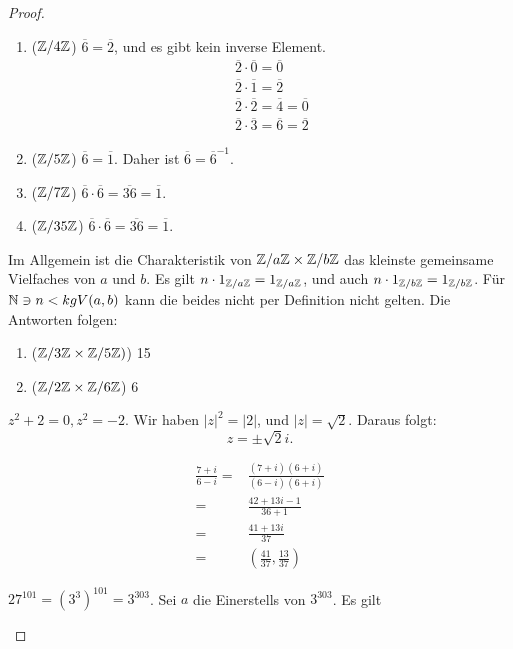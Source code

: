 \begin{proof}
	\begin{parts}
	\item 
		\begin{enumerate}[label=(\roman*)]
			\item ($\mathbb{Z} / 4\mathbb{Z}$) $\overline{6}=\overline{2}$, und es gibt kein inverse Element.
				\begin{gather*}
					\overline{2}\cdot \overline{0}=\overline{0}\\
					\overline{2}\cdot \overline{1}=\overline{2}\\
					\overline{2}\cdot \overline{2}=\overline{4}=\overline{0}\\
					\overline{2}\cdot \overline{3}=\overline{6}=\overline{2}
				\end{gather*}
			\item ($\mathbb{Z} / 5\mathbb{Z}$) $\overline{6}=\overline{1}$. Daher ist $\overline{6}=\overline{6}^{-1}$.
			\item ($\mathbb{Z} / 7\mathbb{Z}$) $\overline{6}\cdot \overline{6}=\overline{36}=\overline{1}$.
			\item ($\mathbb{Z} / 35 \mathbb{Z}$) $\overline{6}\cdot \overline{6}=\overline{36}=\overline{1}$.
		\end{enumerate}
	\item Im Allgemein ist die Charakteristik von $\mathbb{Z} / a\mathbb{Z}\times \mathbb{Z} / b\mathbb{Z}$ das kleinste gemeinsame Vielfaches von $a$ und $b$. Es gilt $n\cdot 1_{\mathbb{Z} / a\mathbb{Z}}=1_{\mathbb{Z} / a \mathbb{Z}}$, und auch $n \cdot 1_{\mathbb{Z} / b\mathbb{Z}}=1_{\mathbb{Z} / b \mathbb{Z}}$. F\"{u}r $\mathbb{N} \ni n < kgV(a,b)$ kann die beides nicht per Definition nicht gelten. Die Antworten folgen: 
		\begin{enumerate}[label=(\roman*)]
			\item ($\mathbb{Z} / 3\mathbb{Z} \times \mathbb{Z} / 5\mathbb{Z})$) 15
			\item ($\mathbb{Z} / 2\mathbb{Z} \times \mathbb{Z} / 6\mathbb{Z}$) 6
		\end{enumerate}
	\item $z^2+2=0, z^2=-2$. Wir haben $|z|^2=|2|$, und $|z|=\sqrt{2} $. Daraus folgt:
		\[
			z=\pm\sqrt{2}i
		.\] 
	\item 
		\begin{align*}
			\frac{7+i}{6-i}=&\frac{(7+i)(6+i)}{(6-i)(6+i)}\\
			=& \frac{42+13i-1}{36+1}\\
			=& \frac{41+13i}{37}\\
			=&\left( \frac{41}{37},\frac{13}{37} \right) 
		\end{align*}
	\item $27^{101}=(3^3)^{101}=3^{303}$. Sei $a$ die Einerstells von $3^{303}$. Es gilt

\end{parts}
\end{proof}
